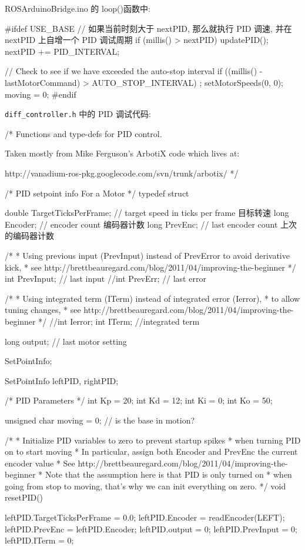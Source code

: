 \documentclass[openany, fontset=windowsold]{ctexbook}
\theoremstyle{kaiti}
\theoremstyle{normal}
\begin{document}
\begin{cpp}
  ROSArduinoBridge.ino 的 loop()函数中:

  #ifdef USE_BASE
    // 如果当前时刻大于 nextPID, 那么就执行 PID 调速, 并在 nextPID 上自增一个 PID 调试周期
    if (millis() > nextPID) {
      updatePID();
      nextPID += PID_INTERVAL;
    }

    // Check to see if we have exceeded the auto-stop interval
    if ((millis() - lastMotorCommand) > AUTO_STOP_INTERVAL) {;
      setMotorSpeeds(0, 0);
      moving = 0;
    }
  #endif
\end{cpp}

\verb|diff_controller.h| 中的 PID 调试代码:

\begin{cpp}
  /* Functions and type-defs for PID control.

    Taken mostly from Mike Ferguson's ArbotiX code which lives at:

    http://vanadium-ros-pkg.googlecode.com/svn/trunk/arbotix/
  */

  /* PID setpoint info For a Motor */
  typedef struct {
    double TargetTicksPerFrame;    // target speed in ticks per frame 目标转速
    long Encoder;                  // encoder count 编码器计数
    long PrevEnc;                  // last encoder count 上次的编码器计数

    /*
    * Using previous input (PrevInput) instead of PrevError to avoid derivative kick,
    * see http://brettbeauregard.com/blog/2011/04/improving-the-beginner%
    */
    int PrevInput;                // last input
    //int PrevErr;                   // last error

    /*
    * Using integrated term (ITerm) instead of integrated error (Ierror),
    * to allow tuning changes,
    * see http://brettbeauregard.com/blog/2011/04/improving-the-beginner%
    */
    //int Ierror;
    int ITerm;                    //integrated term

    long output;                    // last motor setting
  }
  SetPointInfo;

  SetPointInfo leftPID, rightPID;

  /* PID Parameters */
  int Kp = 20;
  int Kd = 12;
  int Ki = 0;
  int Ko = 50;

  unsigned char moving = 0; // is the base in motion?

  /*
  * Initialize PID variables to zero to prevent startup spikes
  * when turning PID on to start moving
  * In particular, assign both Encoder and PrevEnc the current encoder value
  * See http://brettbeauregard.com/blog/2011/04/improving-the-beginner%
  * Note that the assumption here is that PID is only turned on
  * when going from stop to moving, that's why we can init everything on zero.
  */
  void resetPID(){
    leftPID.TargetTicksPerFrame = 0.0;
    leftPID.Encoder = readEncoder(LEFT);
    leftPID.PrevEnc = leftPID.Encoder;
    leftPID.output = 0;
    leftPID.PrevInput = 0;
    leftPID.ITerm = 0;

}
\end{cpp}
\end{document}
